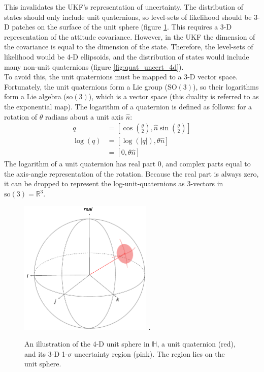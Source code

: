 \documentclass[conference]{IEEEtran}
\begin{document}
This invalidates the UKF's representation of uncertainty. The distribution of states should only include unit quaternions, so level-sets of likelihood should be 3-D patches on the surface of the unit sphere (figure \ref{fig:quat_uncert_3d}. This requires a 3-D representation of the attitude covariance. However, in the UKF the dimension of the covariance is equal to the dimension of the state. Therefore, the level-sets of likelihood would be 4-D ellipsoids, and the distribution of states would include many non-unit quaternions (figure \ref{fig:quat_uncert_4d}).\\

To avoid this, the unit quaternions must be mapped to a 3-D vector space. Fortunately, the unit quaternions form a Lie group ($\mathrm{SO(3)}$), so their logarithms form a Lie algebra ($\mathrm{so(3)}$), which is a vector space (this duality is referred to as the exponential map). The logarithm of a quaternion is defined as follows: for a rotation of $\theta$ radians about a unit axis $\hat{n}$:
\begin{align}
    q &= [\cos(\frac{\theta}{2}), \hat{n} \sin(\frac{\theta}{2})] \\
    \log(q) &= [\log(|q|), \theta \hat{n}]\\
        &= [0, \theta \hat{n}]
\end{align}
The logarithm of a unit quaternion has real part 0, and complex parts equal to the axis-angle representation of the rotation. Because the real part is always zero, it can be dropped to represent the log-unit-quaternions as 3-vectors in $\mathrm{so(3)} = \mathbb{R}^3$.\\

\begin{figure}[!t]
  \centering
  \includegraphics[width=2.5in]{figures/quat_uncert_3d.png}
  \DeclareGraphicsExtensions.
  \caption{An illustration of the 4-D unit sphere in $\mathbb{H}$, a unit quaternion (red), and its 3-D 1-$\sigma$ uncertainty region (pink). The region lies on the unit sphere.}
  \label{fig:quat_uncert_3d}
\end{figure}
\end{document}
